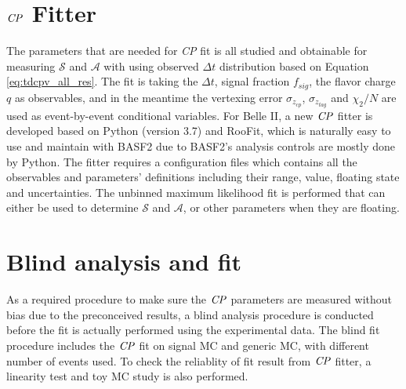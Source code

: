  

 
 
 
 
 




\section{$\it{CP}$ Fitter}

The parameters that are needed for \textit{CP} fit is all studied and obtainable for measuring $\mathcal{S}$ and $\mathcal{A}$  with using observed $\Delta t$ distribution based on Equation \ref{eq:tdcpv_all_res}. The fit is taking the $\Delta t$, signal fraction $f_{sig}$, the flavor charge $q$ as observables, and in the meantime the vertexing error $\sigma_{z_{cp}}$, $\sigma_{z_{tag}}$ and $\chi_2/N$ are used as event-by-event conditional variables.
For Belle II, a new $\it{CP}$ fitter is developed based on Python (version 3.7) and RooFit, which is naturally easy to use and maintain with BASF2 due to BASF2's analysis controls are mostly done by Python. The fitter requires a configuration files which contains all the observables and parameters' definitions including their range, value, floating state and uncertainties. The unbinned maximum likelihood fit is performed that can either be used to determine  $\mathcal{S}$ and $\mathcal{A}$, or other parameters when they are floating.

\section{Blind analysis and fit}
As a required procedure to make sure the $\it{CP}$ parameters are measured without bias due to the preconceived results, a blind analysis procedure is conducted before the fit is actually performed using the experimental data. The blind fit procedure includes the $\it{CP}$ fit on signal MC and generic MC, with different number of events used. To check the reliablity of fit result from $\it{CP}$ fitter, a linearity test and toy MC study is also performed. 

